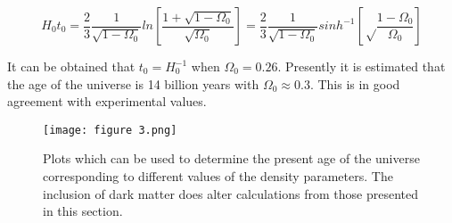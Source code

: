 \begin{equation}
    H_0t_0 = \frac{2}{3}\frac{1}{\sqrt{1-\Omega_0}}ln[\frac{1+\sqrt{1-\Omega_0}}{\sqrt{\Omega_0}}] = \frac{2}{3}\frac{1}{\sqrt{1-\Omega_0}}sinh^{-1}[\sqrt\frac{1-\Omega_0}{\Omega_0}]
\end{equation}

It can be obtained that $t_0 = H_0^{-1}$ when $\Omega_0 = 0.26$. Presently it is estimated that the age of the universe is 14 billion years with $\Omega_0 \approx 0.3$. This is in good agreement with experimental values.

\begin{figure}[H]
    \centering
    \texttt{[image: figure 3.png]}
    \caption{Plots which can be used to determine the present age of the universe corresponding to different values of the density parameters. The inclusion of dark matter does alter calculations from those presented in this section.}
    \label{fig:age}
\end{figure}